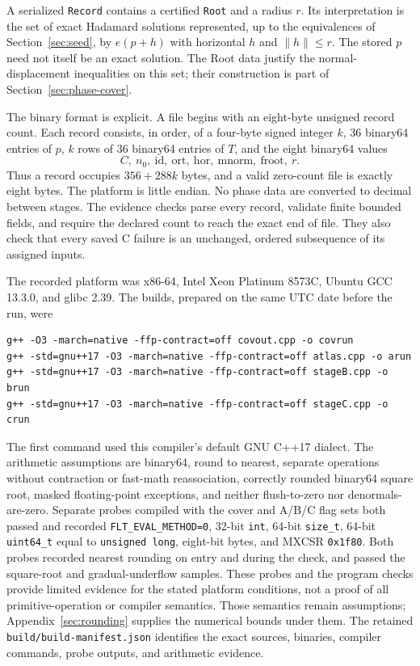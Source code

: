 A serialized \texttt{Record} contains a certified \texttt{Root} and a
radius $r$. Its interpretation is the set of exact Hadamard solutions
represented, up to the equivalences of Section~\ref{sec:seed}, by
$e(p+h)$ with horizontal $h$ and $\|h\|\le r$. The stored $p$ need not
itself be an exact solution. The Root data justify the normal-displacement
inequalities on this set; their construction is part of
Section~\ref{sec:phase-cover}.

The binary format is explicit. A file begins with an eight-byte unsigned
record count. Each record consists, in order, of a four-byte signed
integer $k$, 36 binary64 entries of $p$, $k$ rows of 36 binary64 entries
of $T$, and the eight binary64 values
\[
 C,\ n_0,\ \mathrm{id},\ \mathrm{ort},\ \mathrm{hor},\
 \mathrm{mnorm},\ \mathrm{froot},\ r.
\]
Thus a record occupies $356+288k$ bytes, and a valid zero-count file is
exactly eight bytes. The platform is little endian. No phase data are
converted to decimal between stages. The evidence checks parse every
record, validate finite bounded fields, and require the declared count
to reach the exact end of file. They also check that every saved C
failure is an unchanged, ordered subsequence of its assigned inputs.

The recorded platform was x86-64, Intel Xeon Platinum 8573C, Ubuntu
GCC 13.3.0, and glibc 2.39. The builds, prepared on the same UTC date
before the run, were
\begin{lstlisting}
g++ -O3 -march=native -ffp-contract=off covout.cpp -o covrun
g++ -std=gnu++17 -O3 -march=native -ffp-contract=off atlas.cpp -o arun
g++ -std=gnu++17 -O3 -march=native -ffp-contract=off stageB.cpp -o brun
g++ -std=gnu++17 -O3 -march=native -ffp-contract=off stageC.cpp -o crun
\end{lstlisting}
The first command used this compiler's default GNU C++17 dialect.
The arithmetic assumptions are binary64, round to nearest, separate
operations without contraction or fast-math reassociation, correctly
rounded binary64 square root, masked floating-point exceptions, and
neither flush-to-zero nor denormals-are-zero. Separate probes compiled
with the cover and A/B/C flag sets both passed and recorded
\texttt{FLT\_EVAL\_METHOD=0}, 32-bit \texttt{int}, 64-bit
\texttt{size\_t}, 64-bit \texttt{uint64\_t} equal to
\texttt{unsigned long}, eight-bit bytes, and MXCSR \texttt{0x1f80}.
Both probes recorded nearest rounding on entry and during the check,
and passed the square-root and gradual-underflow samples. These probes
and the program checks provide limited evidence for the stated platform
conditions, not a proof of all primitive-operation or compiler semantics.
Those semantics remain assumptions; Appendix~\ref{sec:rounding} supplies
the numerical bounds under them. The retained
\texttt{build/build-manifest.json} identifies the exact sources,
binaries, compiler commands, probe outputs, and arithmetic evidence.

